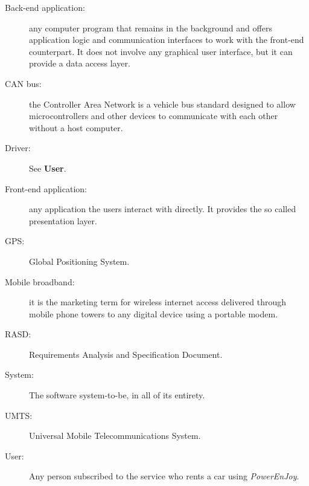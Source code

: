 \begin{description}
\item[Back-end application:] any computer program that remains in the background and offers application logic and communication interfaces to work with the front-end counterpart. It does not involve any graphical user interface, but it can provide a data access layer.
\item[CAN bus:] the Controller Area Network is a vehicle bus standard designed to allow microcontrollers and other devices to communicate with each other without a host computer.
\item[Driver:] See \textbf{User}.
\item[Front-end application:] any application the users interact with directly. It provides the so called presentation layer.
\item[GPS:] Global Positioning System.
\item[Mobile broadband:] it is the marketing term for wireless internet access delivered through mobile phone towers to any digital device using a portable modem.
\item[RASD:] Requirements Analysis and Specification Document.
\item[System:] The software system-to-be, in all of its entirety.
\item[UMTS:] Universal Mobile Telecommunications System.
\item[User:] Any person subscribed to the service who rents a car using \hbox{\emph{PowerEnJoy}}.
\end{description}

